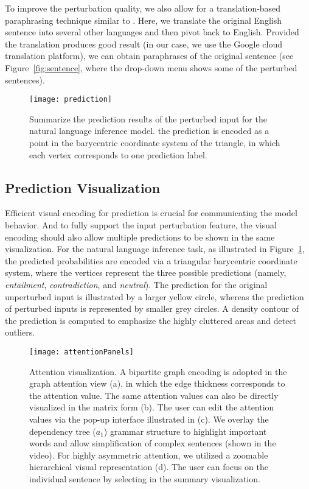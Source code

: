 To improve the perturbation quality, we also allow for a translation-based paraphrasing technique similar to \citet{mallinson2017paraphrasing}. Here, we translate the original English sentence into several other languages and then pivot back to English. Provided the translation produces good result (in our case, we use the Google cloud translation platform), we can obtain paraphrases of the original sentence (see Figure~\ref{fig:sentence}, where the drop-down menu shows some of the perturbed sentences).

\begin{figure}[htbp]
\centering
\vspace{-2mm}
 \texttt{[image: prediction]}
 \caption{
Summarize the prediction results of the perturbed input for the natural language inference model.
the prediction is encoded as a point in the barycentric coordinate system of the triangle, in which each vertex corresponds to one prediction label.
}
\vspace{-3mm}
\label{fig:prediction}
\end{figure}

\subsection{Prediction Visualization}
Efficient visual encoding for prediction is crucial for communicating the model behavior. And to fully support the input perturbation feature, the visual encoding should also allow multiple predictions to be shown in the same visualization.
%
For the natural language inference task, as illustrated in Figure~\ref{fig:prediction}, the predicted probabilities are encoded via a triangular barycentric coordinate system, where the vertices represent the three possible predictions (namely, \emph{entailment}, \emph{contradiction}, and \emph{neutral}). The prediction for the original unperturbed input is illustrated by a larger yellow circle, whereas the prediction of perturbed inputs is represented by smaller grey circles.
A density contour of the prediction is computed to emphasize the highly cluttered areas and detect outliers.

\begin{figure*}[t]
\centering
\vspace{-2mm}
 \texttt{[image: attentionPanels]}
  \vspace{-3mm}
 \caption{
Attention visualization. A bipartite graph encoding is adopted in the graph attention view (a), in which the edge thickness corresponds to the attention value. The same attention values can also be directly visualized in the matrix form (b).
The user can edit the attention values via the pop-up interface illustrated in (c).
We overlay the dependency tree ($a_1$) grammar structure to highlight important words and allow simplification of complex sentences (shown in the video).
%
For highly asymmetric attention, we utilized a zoomable hierarchical visual representation (d). The user can focus on the individual sentence by selecting in the summary visualization.
}
\vspace{-3mm}
\label{fig:attentionVis}
\end{figure*}

